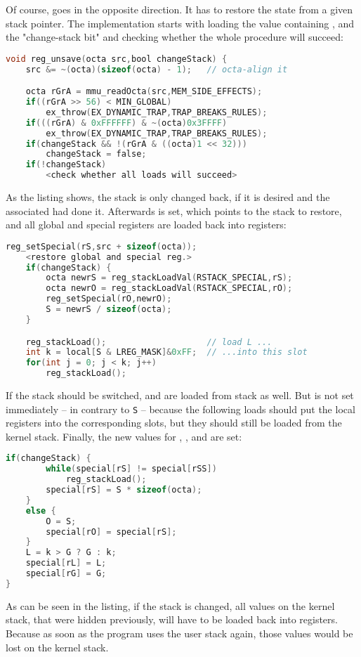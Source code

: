 Of course,  goes in the opposite direction. It has to restore the state from a given stack pointer. The implementation starts with loading the value containing ,  and the "change-stack bit" and checking whether the whole procedure will succeed:
\begin{lstlisting}[language=C,caption={Implementation of {\tt reg\_unsave}, part 1 (partially pseudo-code)}]
void reg_unsave(octa src,bool changeStack) {
	src &= ~(octa)(sizeof(octa) - 1);	// octa-align it

	octa rGrA = mmu_readOcta(src,MEM_SIDE_EFFECTS);
	if((rGrA >> 56) < MIN_GLOBAL)
		ex_throw(EX_DYNAMIC_TRAP,TRAP_BREAKS_RULES);
	if(((rGrA) & 0xFFFFFF) & ~(octa)0x3FFFF)
		ex_throw(EX_DYNAMIC_TRAP,TRAP_BREAKS_RULES);
	if(changeStack && !(rGrA & ((octa)1 << 32)))
		changeStack = false;
	if(!changeStack)
		<check whether all loads will succeed>
\end{lstlisting}
As the listing shows, the stack is only changed back, if it is desired and the associated  had done it. Afterwards  is set, which points to the stack to restore, and all global and special registers are loaded back into registers:
\begin{lstlisting}[language=C,caption={Implementation of {\tt reg\_unsave}, part 2 (partially pseudo-code)}]
	reg_setSpecial(rS,src + sizeof(octa));
	<restore global and special reg.>
	if(changeStack) {
		octa newrS = reg_stackLoadVal(RSTACK_SPECIAL,rS);
		octa newrO = reg_stackLoadVal(RSTACK_SPECIAL,rO);
		reg_setSpecial(rO,newrO);
		S = newrS / sizeof(octa);
	}

	reg_stackLoad();					// load L ...
	int k = local[S & LREG_MASK]&0xFF;	// ...into this slot
	for(int j = 0; j < k; j++)
		reg_stackLoad();
\end{lstlisting}
If the stack should be switched,  and  are loaded from stack as well. But  is not set immediately -- in contrary to {\tt S} -- because the following loads should put the local registers into the corresponding slots, but they should still be loaded from the kernel stack. Finally, the new values for , ,  and  are set:
\begin{lstlisting}[language=C,caption={Implementation of {\tt reg\_unsave}, part 3}]
	if(changeStack) {
		while(special[rS] != special[rSS])
			reg_stackLoad();
		special[rS] = S * sizeof(octa);
	}
	else {
		O = S;
		special[rO] = special[rS];
	}
	L = k > G ? G : k;
	special[rL] = L;
	special[rG] = G;
}
\end{lstlisting}
As can be seen in the listing, if the stack is changed, all values on the kernel stack, that were hidden previously, will have to be loaded back into registers. Because as soon as the program uses the user stack again, those values would be lost on the kernel stack.

